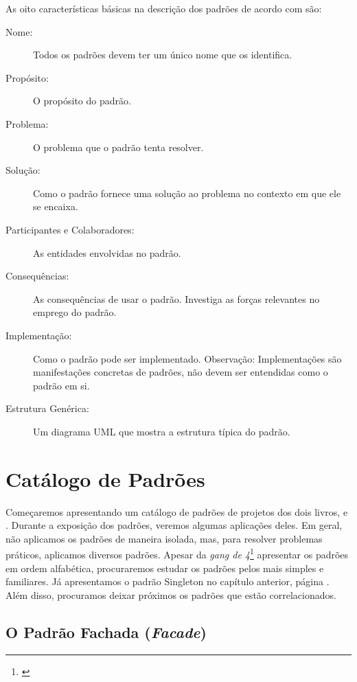 \documentclass[
	11pt,				%
	openright,
	twoside,			%
	a4paper,			%
	english,			%
	french,
	brazil,				%
	sumario=tradicional
	]{abntex2}
\begin{document}
As oito características básicas na descrição dos padrões de acordo com  são:
\begin{description}
\item[Nome:] Todos os padrões devem ter um único nome que os identifica.

\item[Propósito:] O propósito do padrão.

\item[Problema:] O problema que o padrão tenta resolver.

\item[Solução:] Como o padrão fornece uma solução ao problema no contexto em que ele se encaixa.

\item[Participantes e Colaboradores:] As entidades envolvidas no padrão.

\item[Consequências:] As consequências de usar o padrão. Investiga as forças relevantes no emprego do padrão.

\item[Implementação:] Como o padrão pode ser implementado. Observação: Implementações são manifestações concretas de padrões, não devem ser entendidas como o padrão em si.

\item[Estrutura Genérica:] Um diagrama UML que mostra a estrutura típica do padrão.

\end{description}

\section{Catálogo de Padrões}

Começaremos apresentando um catálogo de padrões de projetos dos dois livros, \cite{design:patterns} e \cite{DP:explained}. Durante a exposição dos padrões, veremos algumas aplicações deles. Em geral, não aplicamos os padrões de maneira isolada, mas, para resolver problemas práticos, aplicamos diversos padrões. Apesar da \textit{gang de 4}\footnote{\cite{design:patterns}} apresentar os padrões em ordem alfabética, procuraremos estudar os padrões pelos mais simples e familiares. Já apresentamos o padrão Singleton no capítulo anterior, página \pageref{p:singleton}. Além disso, procuramos deixar próximos os padrões que estão correlacionados.

\subsection{O Padrão Fachada (\textit{Facade})}
\end{document}
